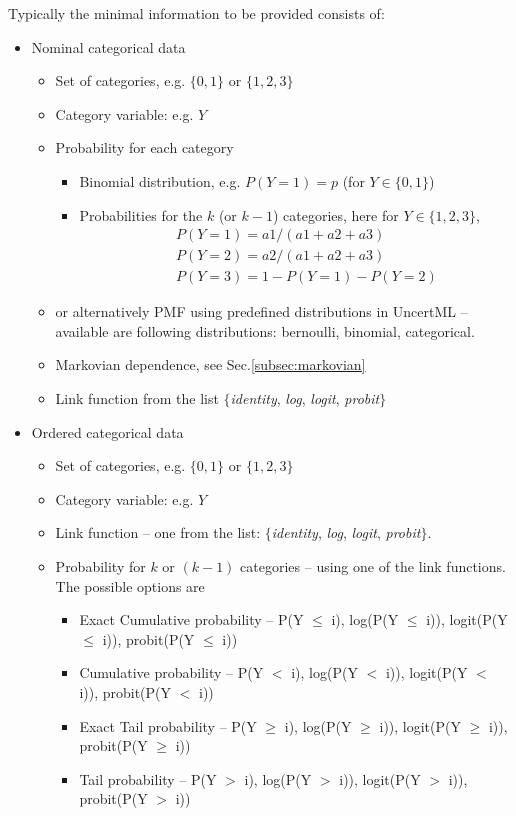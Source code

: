 Typically the minimal information to be provided consists of:
\begin{itemize}
\item
Nominal categorical data 
\begin{itemize}
\item
Set of categories, e.g. $\{0,1\}$ or $\{1,2,3\}$
\item
Category variable: e.g. $Y$
\item
Probability for each category
\begin{itemize}
\item
Binomial distribution, e.g. $P(Y=1) = p$ (for $Y \in \{0,1\}$) 
\item
Probabilities for the $k$ (or $k-1$) categories, here for $Y \in \{1,2,3\}$, 
\begin{eqnarray}
&&P(Y=1)=a1/(a1+a2+a3) \nonumber \\
&&P(Y=2)=a2/(a1+a2+a3)  \nonumber \\
&&P(Y=3)=1-P(Y=1)-P(Y=2) \nonumber
\end{eqnarray}
\end{itemize}
\item
or alternatively PMF using predefined distributions in UncertML -- available are following distributions: 
bernoulli, binomial, categorical.
\item
Markovian dependence, see Sec.\ref{subsec:markovian}
\item
Link function from the list $\{$\emph{identity}, \emph{log}, \emph{logit}, \emph{probit}$\}$
\end{itemize}
\item
Ordered categorical data
\begin{itemize}
\item
Set of categories, e.g. $\{0,1\}$ or $\{1,2,3\}$
\item
Category variable: e.g. $Y$
\item
Link function -- one from the list: $\{$\emph{identity}, \emph{log}, \emph{logit}, \emph{probit}$\}$. 
\item
Probability for $k$ or $(k - 1)$ categories -- using one of the link functions. The possible options are 
\begin{itemize}
\item
Exact Cumulative  probability -- P(Y $\leq$ i), log(P(Y $\leq$ i)), logit(P(Y $\leq$ i)), probit(P(Y $\leq$ i)) 
\item
Cumulative  probability -- P(Y $<$ i), log(P(Y $<$ i)), logit(P(Y $<$ i)), probit(P(Y $<$ i)) 
\item
Exact Tail probability  -- P(Y $\geq$ i), log(P(Y $\geq$ i)), logit(P(Y $\geq$ i)), probit(P(Y $\geq$ i)) 
\item
Tail probability -- P(Y $>$ i), log(P(Y $>$ i)), logit(P(Y $>$ i)), probit(P(Y $>$ i)) 
\end{itemize}


\end{itemize}
\end{itemize}
